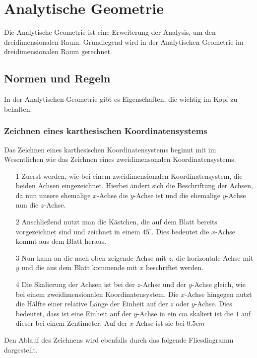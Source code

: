 \section{Analytische Geometrie}
Die Analytische Geometrie ist eine Erweiterung der Analysis, um den dreidimensionalen Raum. Grundlegend wird in der Analytischen Geometrie im dreidimensionalen Raum gerechnet.
\subsection{Normen und Regeln}
In der Analytischen Geometrie gibt es Eigenschaften, die wichtig im Kopf zu behalten. 
\subsubsection{Zeichnen eines karthesischen Koordinatensystems}
Das Zeichnen eines karthesischen Koordinatensystems beginnt mit im Wesentlichen wie das Zeichnen eines zweidimensonalen Koordinatensystems. 
\begin{itemize}
\item[1] Zuerst werden, wie bei einem zweidimensionalen Koordinatensystem, die beiden Achsen eingezeichnet. Hierbei ändert sich die Beschriftung der Achsen, da nun unsere ehemalige $x$-Achse die $y$-Achse ist und die ehemalige $y$-Achse nun die $z$-Achse.
\item[2] Anschließend nutzt man die Kästchen, die auf dem Blatt bereits vorgezeichnet sind und zeichnet in einem $45^{\circ}$. Dies bedeutet die $x$-Achse kommt aus dem Blatt heraus. 
\item[3] Nun kann an die nach oben zeigende Achse mit $z$, die horizontale Achse mit $y$ und die aus dem Blatt kommende mit $x$ beschriftet werden. 
\item[4] Die Skalierung der Achsen ist bei der $z$-Achse und der $y$-Achse gleich, wie bei einem zweidimensionalen Koordinatensystem. Die $x$-Achse hingegen nutzt die Hälfte einer relative Länge der Einheit auf der $z$ oder $y$-Achse. Dies bedeutet, dass ist eine Einheit auf der $y$-Achse in ein $cm$ skaliert ist die $1$ auf dieser bei einem Zentimeter. Auf der $x$-Achse ist sie bei $0.5cm$
\end{itemize}
Den Ablauf des Zeichnens wird ebenfalls durch das folgende Fliesdiagramm dargestellt. 
\pagebreak
